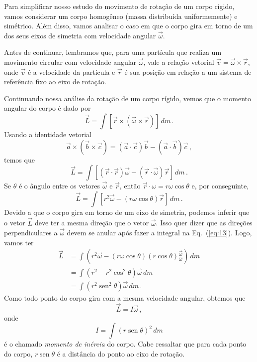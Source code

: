 \documentclass[twocolumn=on,DIV=calc]{scrartcl}
\newcommand{\dpar}[1]{\left(#1\right)}
\theoremstyle{definition}
\DeclareMathOperator{\sen}{sen}
\begin{document}
Para simplificar nosso estudo do movimento de rotação de um corpo
rígido, vamos considerar um corpo homogêneo (massa distribuída
uniformemente) e simétrico. Além disso, vamos analisar o caso em que o
corpo gira em torno de um dos seus eixos de simetria com velocidade
angular $\vec\omega$.

Antes de continuar, lembramos que, para uma partícula que realiza um
movimento circular com velocidade angular $\vec\omega$, vale a relação
vetorial $\vec v=\vec\omega\times\vec r$, onde $\vec v$ é a velocidade
da partícula e $\vec r$ é sua posição em relação a um sistema de
referência fixo ao eixo de rotação.

Continuando nossa análise da rotação de um corpo rígido, vemos que o
momento angular do corpo é dado por
$$\vec L=\int [\vec r\times(\vec\omega\times\vec r)]\,dm\,.$$
Usando a identidade vetorial
$$\vec a\times(\vec b\times\vec c)=(\vec a\cdot\vec c)\vec b-(\vec a\cdot\vec b)\vec c\,,$$
temos que
\begin{equation}
  \label{eq:13}
  \vec L=\int [(\vec r\cdot\vec r)\vec\omega-(\vec r\cdot\vec\omega)\vec r]\,dm\,.
\end{equation}
Se $\theta$ é o ângulo entre os vetores $\vec\omega$ e $\vec r$, então
$\vec r\cdot\omega=r\omega\cos\theta$ e, por conseguinte,
$$\vec L=\int [r^2\vec\omega-(r\omega\cos\theta)\vec r]\,dm\,.$$
Devido a que o corpo gira em torno de um eixo de simetria, podemos
inferir que o vetor $\vec L$ deve ter a mesma direção que o vetor
$\vec\omega$. Isso quer dizer que as direções perpendiculares a
$\vec\omega$ devem se anular após fazer a integral na
Eq.~(\ref{eq:13}). Logo, vamos ter
\begin{equation*}
  \begin{split}
    \vec L&=\int \dpar{r^2\vec\omega-(r\omega\cos\theta)(r\cos\theta)\frac{\vec\omega}{\omega}}\,dm\\
    &=\int (r^2-r^2\cos^2\theta)\vec\omega\,dm\\
    &=\int (r^2\sen^2\theta)\vec\omega\,dm\,.
  \end{split}
\end{equation*}
Como todo ponto do corpo gira com a mesma velocidade angular, obtemos
que
\begin{equation}
  \label{eq:14}
  \vec L=I\vec\omega\,,
\end{equation}
onde
\begin{equation}
  \label{eq:15}
  I=\int (r\sen\theta)^2\,dm
\end{equation}
é o chamado \textit{momento de inércia} do corpo. Cabe ressaltar que
para cada ponto do corpo, $r\sen\theta$ é a distância do ponto ao eixo
de rotação.
\end{document}
